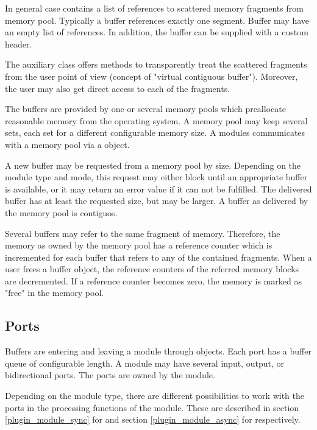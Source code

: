In general case  contains a list of references to scattered memory 
fragments from memory pool. Typically a buffer references exactly one segment.
Buffer may have an empty list of references. In addition, the buffer can be supplied
with a custom header.
 
The auxiliary class   
offers methods to transparently 
treat the scattered fragments from the user point of view 
(concept of "virtual contiguous buffer"). 
Moreover, the user may also get direct access to each of the fragments.      

The buffers are provided by one or several memory pools 
which preallocate reasonable memory from the operating system. 
A memory pool may keep several sets, each set for a different 
configurable memory size. A modules communicates with a memory pool 
via a   object. 

A new buffer may be requested from a memory pool by size. 
Depending on the module type and mode, this request may either block until an 
appropriate buffer is available, or it may return an error value 
if it can not be fulfilled. The delivered buffer has at 
least the requested size, but may be larger. A buffer as 
delivered by the memory pool is contiguos. 

Several buffers may refer to the same fragment of memory. 
Therefore, the memory as owned by the memory pool has a 
reference counter which is incremented for each buffer 
that refers to any of the contained fragments. When a user frees 
a buffer object, the reference counters of the referred 
memory blocks are decremented. If a reference counter becomes 
zero, the memory is marked as "free" in the memory pool.

      
\subsection{Ports}
Buffers are entering and leaving a module through 
  objects. 
Each port has a buffer queue of configurable length.
A module may have several input, output,  
or bidirectional ports. The ports are owned by the module.

Depending on the module type, there are different possibilities to
work with the ports in the processing functions of the module.
These are described in section \ref{plugin_module_sync} for 
and section \ref{plugin_module_async} for  respectively.
 



